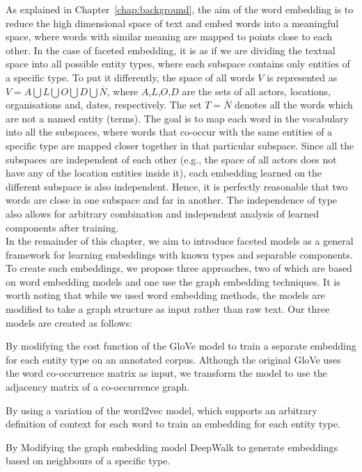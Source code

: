 As explained in Chapter~\ref{chap:background}, the aim of the word embedding is to reduce the high dimensional space of text and embed words into a meaningful space, where words with similar meaning are mapped to points close to each other. In the case of faceted embedding, it is as if we are dividing the textual space into all possible entity types, where each subspace contains only entities of a specific type. To put it differently, the space of all words $V$ is represented as $V=A\bigcup  L\bigcup  O\bigcup  D\bigcup \overline {N} $, where $A$,$L$,$O$,$D$ are the sets of all actors, locations, organisations and, dates, respectively. The set $ T=\overline{N}$ denotes all the words which are not a named entity (terms). The goal is to map each word in the vocabulary into all the subspaces, where words that co-occur with the same entities of a specific type are mapped closer together in that particular subspace. Since all the subspaces are independent of each other (e.g., the space of all actors does not have any of the location entities inside it), each embedding learned on the different subspace is also independent. Hence, it is perfectly reasonable that two words are close in one subspace and far in another. The independence of type also allows for arbitrary combination and independent analysis of learned components after training. \\
In the remainder of this chapter, we aim to introduce faceted models as a general framework for learning embeddings with known types and separable components. To create such embeddings, we propose three approaches, two of which are based on word embedding models and one use the graph embedding techniques. It is worth noting that while we used word embedding methods, the models are modified to take a graph structure as input rather than raw text. Our three models are created as follows: 
\begin{compactenum}
\item By modifying the cost function of the GloVe model to train a separate embedding for each entity type on an annotated corpus. Although the original GloVe uses the word co-occurrence matrix as input, we transform the model to use the adjacency matrix of a co-occurrence graph. 
\item By using a variation of the word2vec model, which supports an arbitrary definition of context for each word to train an embedding for each entity type. 
\item By Modifying the graph embedding model DeepWalk to generate embeddings based on neighbours of a specific type. 
\end{compactenum}
